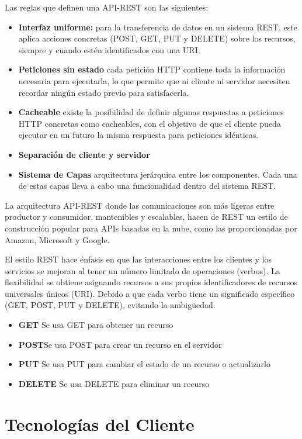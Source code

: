 Las reglas que definen una API-REST son las siguientes:
\begin{itemize}
    \item \textbf {Interfaz uniforme: } para la transferencia de datos en un sistema REST, este aplica acciones concretas (POST, GET, PUT y DELETE) sobre los recursos, siempre y cuando estén identificados con una URI.
    \item \textbf {Peticiones sin estado} cada petición HTTP contiene toda la información necesaria para ejecutarla, lo que permite que ni cliente ni servidor necesiten recordar ningún estado previo para satisfacerla.
    \item \textbf {Cacheable} existe la posibilidad de definir algunas respuestas a peticiones HTTP concretas como cacheables, con el objetivo de que el cliente pueda ejecutar en un futuro la misma respuesta para peticiones idénticas.
    \item \textbf {Separación de cliente y servidor}
    \item \textbf {Sistema de Capas} arquitectura jerárquica entre los componentes. Cada una de estas capas lleva a cabo una funcionalidad dentro del sistema REST.
\end{itemize}

La arquitectura API-REST donde las comunicaciones son más ligeras entre productor y consumidor, mantenibles y escalables, hacen de REST un estilo de construcción popular para APIs basadas en la nube, como las proporcionadas por Amazon, Microsoft y Google.

El estilo REST hace énfasis en que las interacciones entre los clientes y los servicios se mejoran al tener un número limitado de operaciones (verbos). La flexibilidad se obtiene asignando recursos a sus propios identificadores de recursos universales únicos (URI). Debido a que cada verbo tiene un significado específico (GET, POST, PUT y DELETE), evitando la ambigüedad.
\begin{itemize}
    \item \textbf {GET} Se usa GET para obtener un recurso
    \item \textbf {POST}Se usa POST para crear un recurso en el servidor
    \item \textbf {PUT} Se usa PUT para cambiar el estado de un recurso o actualizarlo
    \item \textbf {DELETE} Se usa DELETE para eliminar un recurso
\end{itemize}

\section{Tecnologías del Cliente}

